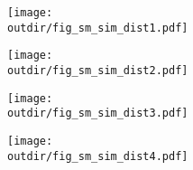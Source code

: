 \documentclass{div}
\newcommand{\outdir}{./../output}
\begin{document}
\begin{figure}[p]\caption{Estimates using Simulated Data from the Search Model}\label{fig_simulation_distribution} 
\begin{subfigure}{.4\textwidth}
\texttt{[image: \\outdir/fig\_sm\_sim\_dist1.pdf]}
\end{subfigure} 
\begin{subfigure}{.4\textwidth}
\texttt{[image: \\outdir/fig\_sm\_sim\_dist2.pdf]}
\end{subfigure} 
\begin{subfigure}{.4\textwidth} 
\texttt{[image: \\outdir/fig\_sm\_sim\_dist3.pdf]}
\end{subfigure} 
\begin{subfigure}{.4\textwidth}
\texttt{[image: \\outdir/fig\_sm\_sim\_dist4.pdf]}
\end{subfigure}
\end{figure}
\end{document}
